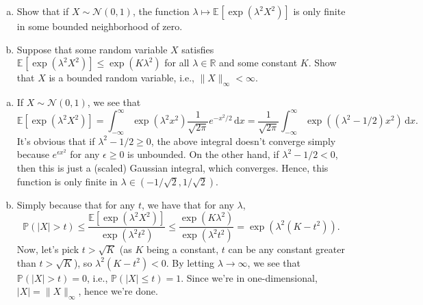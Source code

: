 \begin{problem*}[Exercise 2.5.5]\label{ex2.5.5}
	\begin{enumerate}[(a)]
		\item\label{ex2.5.5:a} Show that if \(X \sim \mathcal{N} (0, 1)\), the function \(\lambda \mapsto \mathbb{E}_{}[\exp (\lambda ^2 X^2)] \) is only finite in some bounded neighborhood of zero.
		\item\label{ex2.5.5:b} Suppose that some random variable \(X\) satisfies \(\mathbb{E}_{}[\exp (\lambda ^2 X^2)] \leq \exp (K \lambda ^2)\) for all \(\lambda \in \mathbb{R} \) and some constant \(K\). Show that \(X\) is a bounded random variable, i.e., \(\lVert X \rVert _\infty < \infty \).
	\end{enumerate}
\end{problem*}
\begin{answer}
	\begin{enumerate}[(a)]
		\item If \(X \sim \mathcal{N} (0, 1)\), we see that
		      \[
			      \mathbb{E}[\exp (\lambda ^2 X^2)]
			      = \int_{-\infty}^{\infty} \exp (\lambda ^2 x^2) \frac{1}{\sqrt{2\pi } }e^{-x^2 / 2} \,\mathrm{d}x
			      = \frac{1}{\sqrt{2\pi } } \int_{-\infty}^{\infty} \exp ((\lambda ^2 - 1 / 2) x^2) \,\mathrm{d}x .
		      \]
		      It's obvious that if \(\lambda ^2 - 1 / 2 \geq 0\), the above integral doesn't converge simply because \(e^{\epsilon x^2}\) for any \(\epsilon \geq 0\) is unbounded. On the other hand, if \(\lambda ^2 - 1 / 2 < 0\), then this is just a (scaled) Gaussian integral, which converges. Hence, this function is only finite in \(\lambda \in (-1 / \sqrt{2} , 1 / \sqrt{2} )\).
		\item Simply because that for any \(t\), we have that for any \(\lambda \),
		      \[
			      \mathbb{P} (\vert X \vert > t)
			      \leq \frac{\mathbb{E}[\exp (\lambda ^2 X^2)] }{\exp (\lambda ^2 t^2) }
			      \leq \frac{\exp (K \lambda ^2)}{\exp (\lambda ^2 t^2)}
			      = \exp (\lambda ^2 (K - t^2)).
		      \]
		      Now, let's pick \(t > \sqrt{K}\) (as \(K\) being a constant, \(t\) can be any constant greater than \(t > \sqrt{K} \)), so \(\lambda ^2 (K - t^2) < 0\). By letting \(\lambda \to \infty \), we see that \(\mathbb{P} (\vert X \vert > t) = 0\), i.e., \(\mathbb{P} (\vert X \vert \leq t) = 1\). Since we're in one-dimensional, \(\vert X \vert = \lVert X \rVert _\infty \), hence we're done.
	\end{enumerate}
\end{answer}


